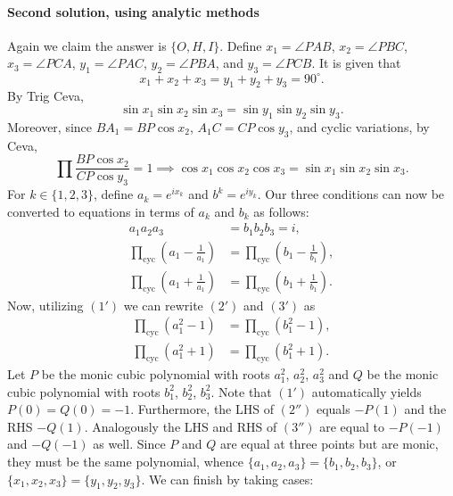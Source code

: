 \paragraph{Second solution, using analytic methods}     Again we claim the answer is $\{O,H,I\}$. Define $x_1=\angle PAB$, $x_2=\angle PBC$, $x_3=\angle PCA$, $y_1=\angle PAC$, $y_2=\angle PBA$, and $y_3=\angle PCB$. It is given that
\setcounter{equation}{0}
\begin{equation}
    x_1+x_2+x_3=y_1+y_2+y_3=90^\circ.
\end{equation}
By Trig Ceva,
\begin{equation}
    \sin x_1\sin x_2\sin x_3=\sin y_1\sin y_2\sin y_3.
\end{equation}
Moreover, since $BA_1=BP\cos x_2$, $A_1C=CP\cos y_3$, and cyclic variations, by Ceva,
\begin{equation}
    \prod\frac{BP\cos x_2}{CP\cos y_3}=1\implies \cos x_1\cos x_2\cos x_3=\sin x_1\sin x_2\sin x_3.
\end{equation}
For $k\in\{1,2,3\}$, define $a_k=e^{ix_k}$ and $b^k=e^{iy_k}$. Our three conditions can now be converted to equations in terms of $a_k$ and $b_k$ as follows:
\begin{align}
    \tag{1'}a_1a_2a_3&=b_1b_2b_3=i,\\
    \tag{2'}\prod_\mathrm{cyc}\left(a_1-\frac1{a_1}\right)&=\prod_\mathrm{cyc}\left(b_1-\frac1{b_1}\right),\\
    \tag{3'}\prod_\mathrm{cyc}\left(a_1+\frac1{a_1}\right)&=\prod_\mathrm{cyc}\left(b_1+\frac1{b_1}\right).
\end{align}
Now, utilizing $(1')$ we can rewrite $(2')$ and $(3')$ as
\begin{align}
    \tag{2''}\prod_\mathrm{cyc}\left(a_1^2-1\right)&=\prod_\mathrm{cyc}\left(b_1^2-1\right),\\
    \tag{3''}\prod_\mathrm{cyc}\left(a_1^2+1\right)&=\prod_\mathrm{cyc}\left(b_1^2+1\right).
\end{align}
Let $P$ be the monic cubic polynomial with roots $a_1^2$, $a_2^2$, $a_3^2$ and $Q$ be the monic cubic polynomial with roots $b_1^2$, $b_2^2$, $b_3^2$. Note that $(1')$ automatically yields $P(0)=Q(0)=-1$. Furthermore, the LHS of $(2'')$ equals $-P(1)$ and the RHS $-Q(1)$. Analogously the LHS and RHS of $(3'')$ are equal to $-P(-1)$ and $-Q(-1)$ as well. Since $P$ and $Q$ are equal at three points but are monic, they must be the same polynomial, whence $\{a_1,a_2,a_3\}=\{b_1,b_2,b_3\}$, or $\{x_1,x_2,x_3\}=\{y_1,y_2,y_3\}$. We can finish by taking cases:
